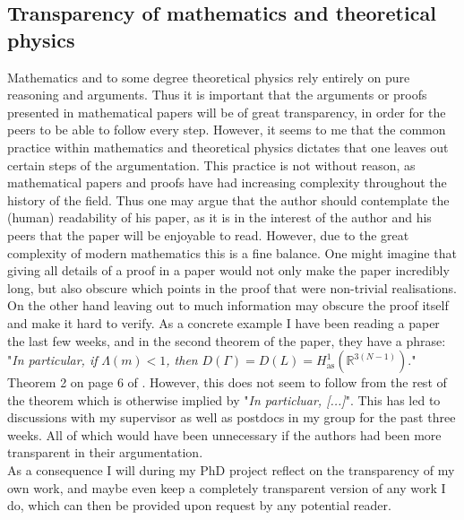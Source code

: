 \documentclass[a4paper, 11pt]{article} %
\begin{document}
\subsection*{Transparency of mathematics and theoretical physics}
Mathematics and to some degree theoretical physics rely entirely on pure reasoning and arguments. Thus it is important that the arguments or proofs presented in mathematical papers will be of great transparency, in order for the peers to be able to follow every step. However, it seems to me that the common practice within mathematics and theoretical physics dictates that one leaves out certain steps of the argumentation. This practice is not without reason, as mathematical papers and proofs have had increasing complexity throughout the history of the field. Thus one may argue that the author should contemplate the (human) readability of his paper, as it is in the interest of the author and his peers that the paper will be enjoyable to read. However, due to the great complexity of modern mathematics this is a fine balance. One might imagine that giving all details of a proof in a paper would not only make the paper incredibly long, but also obscure which points in the proof that were non-trivial realisations. On the other hand leaving out to much information may obscure the proof itself and make it hard to verify. As a concrete example I have been reading a paper the last few weeks, and in the second theorem of the paper, they have a phrase: "\emph{In particular, if} $ \Lambda(m)< 1 $\emph{, then }$ D(\Gamma)=D(L)=H^1_{\text{as}}(\mathbb{R}^{3(N-1)}) $." Theorem 2 on page 6 of \cite{Moser_2017}. However, this does not seem to follow from the rest of the theorem which is otherwise implied by "\emph{In particluar, [...]}". This has led to discussions with my supervisor as well as postdocs in my group for the past three weeks. All of which would have been unnecessary if the authors had been more transparent in their argumentation.\\
As a consequence I will during my PhD project reflect on the transparency of my own work, and maybe even keep a completely transparent version of any work I do, which can then be provided upon request by any potential reader.




\end{document}
